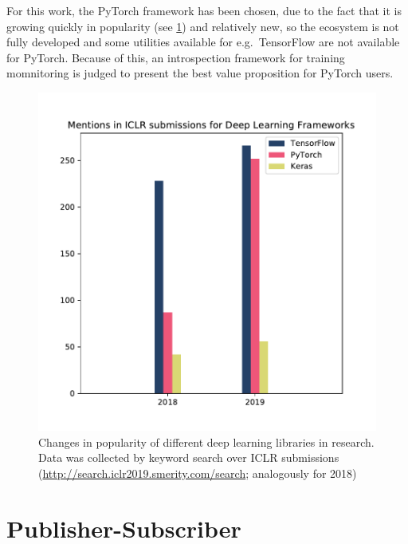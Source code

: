 For this work, the PyTorch framework has been chosen, due to the fact
that it is growing quickly in popularity (see \cref{fig:popularity}) and
relatively new, so the ecosystem is not fully developed and some
utilities available for e.g.~TensorFlow are not available for PyTorch.
Because of this, an introspection framework for training momnitoring is
judged to present the best value proposition for PyTorch users.

\begin{figure}
    \hypertarget{fig:popularity}{%
        \centering
        \includegraphics[max width=\textwidth]{gfx/diagrams/framework_popularity/popularity.pdf}
        \caption[Changes in popularity of different deep learning libraries in
        research]{Changes in popularity of different deep learning libraries in
            research. Data was collected by keyword search over ICLR submissions
            (\href{http://search.iclr2019.smerity.com/search/}{http://search.iclr2019.smerity.com/search};
        analogously for 2018)}\label{fig:popularity}
    }
\end{figure}

\hypertarget{sec:pubsub}{%
\section{Publisher-Subscriber}\label{sec:pubsub}}

